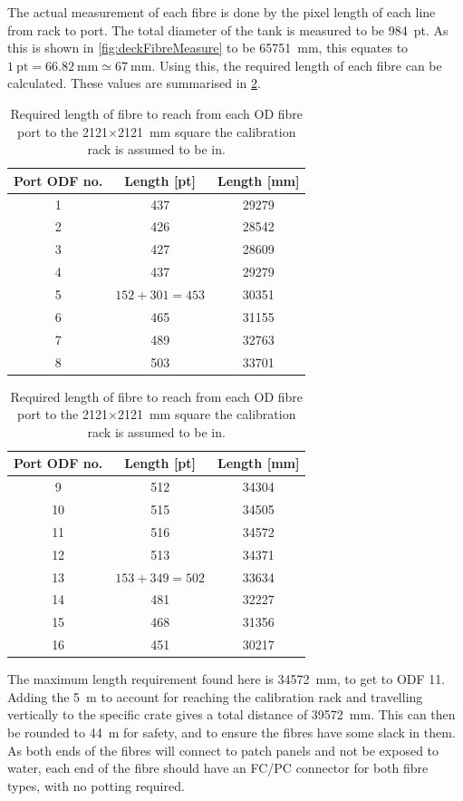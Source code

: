 \documentclass[a4paper,11pt]{article}
\begin{document}
The actual measurement of each fibre is done by the pixel length of each line from rack to port. The total diameter of the tank is measured to be 984~pt. As this is shown in \cref{fig:deckFibreMeasure} to be 65751~mm, this equates to $1~\text{pt} = 66.82~\text{mm} \simeq 67~\text{mm}$. Using this, the required length of each fibre can be calculated. These values are summarised in \cref{tab:deckFibreLen}.
\begin{center}
\begin{table}[h]
\begin{tabular}{ccc} \toprule
Port ODF no. &	Length [pt]	&	Length [mm] \\ \midrule
	1			&	437			&	29279		\\
	2			&	426			&	28542		\\
	3			&	427			&	28609		\\
	4			&	437			&	29279		\\
	5			&$152+301=453$	&	30351		\\
	6			&	465			&	31155		\\
	7			&	489			&	32763		\\
	8			&	503			&	33701		\\
	\bottomrule
\end{tabular}
\begin{tabular}{ccc} \toprule
Port ODF no. &	Length [pt]	&	Length [mm] \\ \midrule
	9			&	512			&	34304		\\
	10			&	515			&	34505		\\
	11			&	516			&	34572		\\
	12			&	513			&	34371		\\
	13			&$153+349=502$	&	33634		\\
	14			&	481			&	32227		\\
	15			&	468			&	31356		\\
	16			&	451			&	30217		\\
	\bottomrule
\end{tabular}
\caption{Required length of fibre to reach from each OD fibre port to the 2121$\times$2121~mm square the calibration rack is assumed to be in.}\label{tab:deckFibreLen}
\end{table}
\end{center}
The maximum length requirement found here is 34572~mm, to get to ODF 11. Adding the 5~m to account for reaching the calibration rack and travelling vertically to the specific crate gives a total distance of 39572~mm. This can then be rounded to 44~m for safety, and to ensure the fibres have some slack in them. As both ends of the fibres will connect to patch panels and not be exposed to water, each end of the fibre should have an FC/PC connector for both fibre types, with no potting required.
\end{document}
